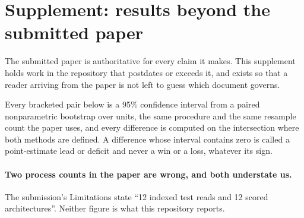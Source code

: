 %
%
%

\section*{Supplement: results beyond the submitted paper}
\label{sec:supplement}

The submitted paper is authoritative for every claim it makes. This supplement
holds work in the repository that postdates or exceeds it, and exists so that a
reader arriving from the paper is not left to guess which document governs.

Every bracketed pair below is a 95\% confidence interval from a paired
nonparametric bootstrap over units, the same procedure and the same resample
count the paper uses, and every difference is computed on the intersection where
both methods are defined. A difference whose interval contains zero is called a
point-estimate lead or deficit and never a win or a loss, whatever its sign.

\paragraph{Two process counts in the paper are wrong, and both understate us.}
The submission's Limitations state ``12 indexed test reads and 12 scored
architectures''. Neither figure is what this repository reports.

